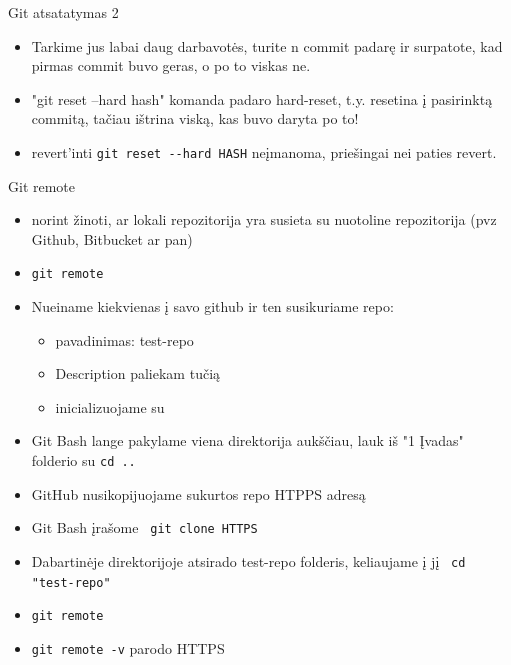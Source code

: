 \documentclass[11pt,xcolor=table]{beamer}
\begin{document}
\begin{frame}[fragile]{Git atsatatymas 2}
\begin{itemize}
\item Tarkime jus labai daug darbavotės, turite n commit padarę ir surpatote, kad pirmas commit buvo geras, o po to viskas ne.
\item "git reset --hard hash" komanda padaro hard-reset, t.y. resetina į pasirinktą commitą, tačiau ištrina viską, kas buvo daryta po to!
\item revert'inti \colorbox{listinggray}{\lstinline|git reset --hard HASH|} neįmanoma, priešingai nei paties revert.
\end{itemize}
\end{frame}


\begin{frame}{Git remote}
\begin{itemize}
\item norint žinoti, ar lokali repozitorija yra susieta su nuotoline repozitorija (pvz Github, Bitbucket ar pan)
\item \colorbox{listinggray}{\lstinline|git remote|}
\end{itemize}
\end{frame}


\begin{frame}
\begin{itemize}
\item Nueiname kiekvienas į savo github ir ten susikuriame repo:
\begin{itemize}
\item pavadinimas: test-repo
\item Description paliekam tučią
\item inicializuojame su 
\end{itemize}
\item Git Bash lange pakylame viena direktorija aukščiau, lauk iš "1 Įvadas" folderio su \colorbox{listinggray}{\lstinline|cd ..|}
\item GitHub nusikopijuojame sukurtos repo HTPPS adresą
\item Git Bash  įrašome \colorbox{listinggray}{\lstinline| git clone HTTPS|}
\item Dabartinėje direktorijoje atsirado test-repo folderis, keliaujame į jį \colorbox{listinggray}{\lstinline| cd "test-repo"|} 
\item \colorbox{listinggray}{\lstinline|git remote|}
\item \colorbox{listinggray}{\lstinline|git remote -v|} parodo HTTPS
\end{itemize}
\end{frame}
\end{document}
